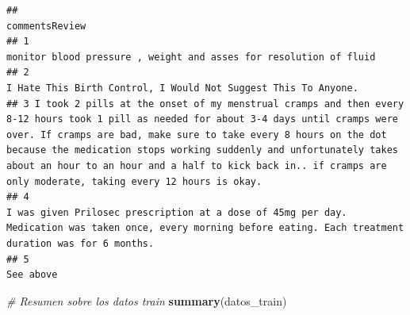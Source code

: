 \documentclass[spanish,]{article}
\newenvironment{Shaded}{\begin{snugshade}}{\end{snugshade}}
\newcommand{\KeywordTok}[1]{\textcolor[rgb]{0.13,0.29,0.53}{\textbf{#1}}}
\newcommand{\CommentTok}[1]{\textcolor[rgb]{0.56,0.35,0.01}{\textit{#1}}}
\newcommand{\NormalTok}[1]{#1}
\begin{document}
\begin{verbatim}
##                                                                                                                                                                                                                                                                                                                                                                                        commentsReview
## 1                                                                                                                                                                                                                                                                                                                                   monitor blood pressure , weight and asses for resolution of fluid
## 2                                                                                                                                                                                                                                                                                                                                      I Hate This Birth Control, I Would Not Suggest This To Anyone.
## 3 I took 2 pills at the onset of my menstrual cramps and then every 8-12 hours took 1 pill as needed for about 3-4 days until cramps were over. If cramps are bad, make sure to take every 8 hours on the dot because the medication stops working suddenly and unfortunately takes about an hour to an hour and a half to kick back in.. if cramps are only moderate, taking every 12 hours is okay.
## 4                                                                                                                                                                                                                                      I was given Prilosec prescription at a dose of 45mg per day. Medication was taken once, every morning before eating. Each treatment duration was for 6 months.
## 5                                                                                                                                                                                                                                                                                                                                                                                           See above
\end{verbatim}

\begin{Shaded}
\begin{Highlighting}[]
\CommentTok{# Resumen sobre los datos train}
\KeywordTok{summary}\NormalTok{(datos_train) }
\end{Highlighting}
\end{Shaded}
\end{document}
